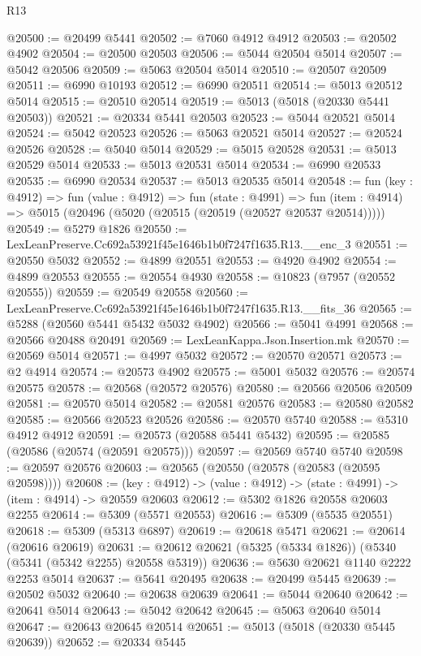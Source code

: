 \begin{lexlean}{R13}
\begin{coremodule}
@20500 := @20499 @5441
@20502 := @7060 @4912 @4912
@20503 := @20502 @4902
@20504 := @20500 @20503
@20506 := @5044 @20504 @5014
@20507 := @5042 @20506
@20509 := @5063 @20504 @5014
@20510 := @20507 @20509
@20511 := @6990 @10193
@20512 := @6990 @20511
@20514 := @5013 @20512 @5014
@20515 := @20510 @20514
@20519 := @5013 (@5018 (@20330 @5441 @20503))
@20521 := @20334 @5441 @20503
@20523 := @5044 @20521 @5014
@20524 := @5042 @20523
@20526 := @5063 @20521 @5014
@20527 := @20524 @20526
@20528 := @5040 @5014
@20529 := @5015 @20528
@20531 := @5013 @20529 @5014
@20533 := @5013 @20531 @5014
@20534 := @6990 @20533
@20535 := @6990 @20534
@20537 := @5013 @20535 @5014
@20548 := fun (key : @4912) =>
  fun (value : @4912) =>
  fun (state : @4991) =>
  fun (item : @4914) => @5015 (@20496 (@5020 (@20515 (@20519 (@20527 @20537 @20514)))))
@20549 := @5279 @1826
@20550 := LexLeanPreserve.Cc692a53921f45e1646b1b0f7247f1635.R13.__enc_3
@20551 := @20550 @5032
@20552 := @4899 @20551
@20553 := @4920 @4902
@20554 := @4899 @20553
@20555 := @20554 @4930
@20558 := @10823 (@7957 (@20552 @20555))
@20559 := @20549 @20558
@20560 := LexLeanPreserve.Cc692a53921f45e1646b1b0f7247f1635.R13.__fits_36
@20565 := @5288 (@20560 @5441 @5432 @5032 @4902)
@20566 := @5041 @4991
@20568 := @20566 @20488 @20491
@20569 := LexLeanKappa.Json.Insertion.mk
@20570 := @20569 @5014
@20571 := @4997 @5032
@20572 := @20570 @20571
@20573 := @2 @4914
@20574 := @20573 @4902
@20575 := @5001 @5032
@20576 := @20574 @20575
@20578 := @20568 (@20572 @20576)
@20580 := @20566 @20506 @20509
@20581 := @20570 @5014
@20582 := @20581 @20576
@20583 := @20580 @20582
@20585 := @20566 @20523 @20526
@20586 := @20570 @5740
@20588 := @5310 @4912 @4912
@20591 := @20573 (@20588 @5441 @5432)
@20595 := @20585 (@20586 (@20574 (@20591 @20575)))
@20597 := @20569 @5740 @5740
@20598 := @20597 @20576
@20603 := @20565 (@20550 (@20578 (@20583 (@20595 @20598))))
@20608 := (key : @4912) -> (value : @4912) -> (state : @4991) -> (item : @4914) -> @20559 @20603
@20612 := @5302 @1826 @20558 @20603 @2255
@20614 := @5309 (@5571 @20553)
@20616 := @5309 (@5535 @20551)
@20618 := @5309 (@5313 @6897)
@20619 := @20618 @5471
@20621 := @20614 (@20616 @20619)
@20631 := @20612 @20621 (@5325 (@5334 @1826)) (@5340 (@5341 (@5342 @2255) @20558 @5319))
@20636 := @5630 @20621 @1140 @2222 @2253 @5014
@20637 := @5641 @20495
@20638 := @20499 @5445
@20639 := @20502 @5032
@20640 := @20638 @20639
@20641 := @5044 @20640
@20642 := @20641 @5014
@20643 := @5042 @20642
@20645 := @5063 @20640 @5014
@20647 := @20643 @20645 @20514
@20651 := @5013 (@5018 (@20330 @5445 @20639))
@20652 := @20334 @5445

\end{coremodule}
\end{lexlean}
